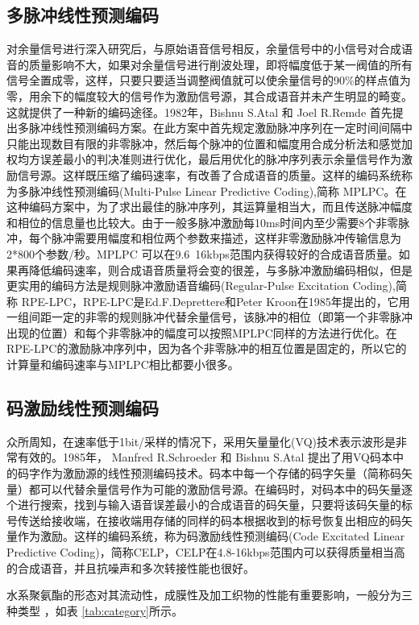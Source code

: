 \subsection{多脉冲线性预测编码}
对余量信号进行深入研究后，与原始语音信号相反，余量信号中的小信号对合成语音的质量影响不大，如果对余量信号进行削波处理，即将幅度低于某一阀值的所有信号全置成零，这样，只要只要适当调整阀值就可以使余量信号的90\%的样点值为零，用余下的幅度较大的信号作为激励信号源，其合成语音并未产生明显的畸变。这就提供了一种新的编码途径。1982年，Bishnu S.Atal 和 Joel R.Remde 首先提出多脉冲线性预测编码方案。在此方案中首先规定激励脉冲序列在一定时间间隔中只能出现数目有限的非零脉冲，然后每个脉冲的位置和幅度用合成分析法和感觉加权均方误差最小的判决准则进行优化，最后用优化的脉冲序列表示余量信号作为激励信号源。这样既压缩了编码速率，有改善了合成语音的质量。这样的编码系统称为多脉冲线性预测编码(Multi-Pulse Linear Predictive Coding),简称 MPLPC。在这种编码方案中，为了求出最佳的脉冲序列，其运算量相当大，而且传送脉冲幅度和相位的信息量也比较大。由于一般多脉冲激励每10ms时间内至少需要8个非零脉冲，每个脉冲需要用幅度和相位两个参数来描述，这样非零激励脉冲传输信息为2*800个参数/秒。MPLPC 可以在9.6~16kbps范围内获得较好的合成语音质量。如果再降低编码速率，则合成语音质量将会变的很差，与多脉冲激励编码相似，但是更实用的编码方法是规则脉冲激励语音编码(Regular-Pulse Excitation Coding),简称 RPE-LPC，RPE-LPC是Ed.F.Deprettere和Peter Kroon在1985年提出的，它用一组间距一定的非零的规则脉冲代替余量信号，该脉冲的相位（即第一个非零脉冲出现的位置）和每个非零脉冲的幅度可以按照MPLPC同样的方法进行优化。在RPE-LPC的激励脉冲序列中，因为各个非零脉冲的相互位置是固定的，所以它的计算量和编码速率与MPLPC相比都要小很多。

\subsection{码激励线性预测编码}

众所周知，在速率低于1bit/采样的情况下，采用矢量量化(VQ)技术表示波形是非常有效的。1985年， Manfred R.Schroeder 和 Bishnu S.Atal 提出了用VQ码本中的码字作为激励源的线性预测编码技术。码本中每一个存储的码字矢量（简称码矢量）都可以代替余量信号作为可能的激励信号源。在编码时，对码本中的码矢量逐个进行搜索，找到与输入语音误差最小的合成语音的码矢量，只要将该码矢量的标号传送给接收端，在接收端用存储的同样的码本根据收到的标号恢复出相应的码矢量作为激励。这样的编码系统，称为码激励线性预测编码(Code Excitated Linear Predictive Coding)，简称CELP，CELP在4.8-16kbps范围内可以获得质量相当高的合成语音，并且抗噪声和多次转接性能也很好。

水系聚氨酯的形态对其流动性，成膜性及加工织物的性能有重要影响，一般分为三种类型\cite{Jiang2005Size} ，如表 \ref{tab:category}所示。

